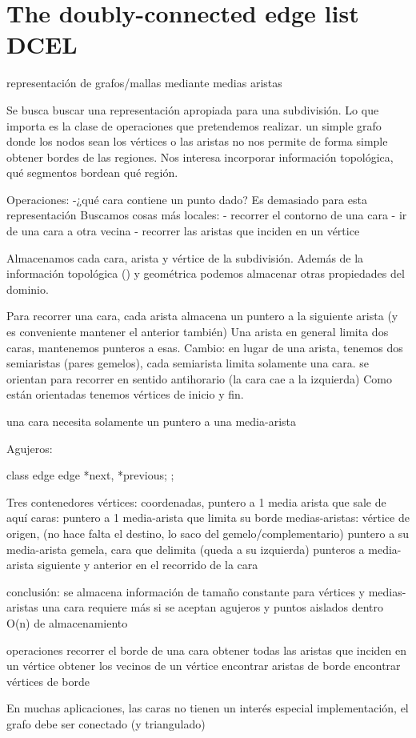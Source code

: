 \section{The doubly-connected edge list DCEL}
representación de grafos/mallas mediante medias aristas

Se busca buscar una representación apropiada para una subdivisión.
Lo que importa es la clase de operaciones que pretendemos realizar.
un simple grafo donde los nodos sean los vértices o las aristas 
no nos permite de forma simple obtener bordes de las regiones.
Nos interesa incorporar información topológica, qué segmentos bordean qué región.


Operaciones:
-¿qué cara contiene un punto dado? Es demasiado para esta representación
Buscamos cosas más locales:
- recorrer el contorno de una cara
- ir de una cara a otra vecina
- recorrer las aristas que inciden en un vértice

Almacenamos cada cara, arista y vértice de la subdivisión.
Además de la información topológica ()
y geométrica podemos almacenar otras propiedades del dominio.

Para recorrer una cara, cada arista almacena un puntero a la siguiente arista (y es conveniente mantener el anterior también)
Una arista en general limita dos caras, mantenemos punteros a esas.
Cambio: en lugar de una arista, tenemos dos semiaristas (pares gemelos),
cada semiarista limita solamente una cara.
se orientan para recorrer en sentido antihorario (la cara cae a la izquierda)
Como están orientadas tenemos vértices de inicio y fin.

una cara necesita solamente un puntero a una media-arista

Agujeros:

class edge{
	edge *next, *previous;
};

Tres contenedores
	vértices: coordenadas, puntero a 1 media arista que sale de aquí
	caras: puntero a 1 media-arista que limita su borde
	medias-aristas:
		vértice de origen, (no hace falta el destino, lo saco del gemelo/complementario)
		puntero a su media-arista gemela,
		cara que delimita (queda a su izquierda)
		punteros a media-arista siguiente y anterior en el recorrido de la cara

conclusión:
	se almacena información de tamaño constante para vértices y medias-aristas
	una cara requiere más si se aceptan agujeros y puntos aislados dentro
	O(n) de almacenamiento

operaciones
	recorrer el borde de una cara
	obtener todas las aristas que inciden en un vértice
	obtener los vecinos de un vértice
	encontrar aristas de borde 
	encontrar vértices de borde

En muchas aplicaciones, las caras no tienen un interés especial
implementación, el grafo debe ser conectado (y triangulado)
